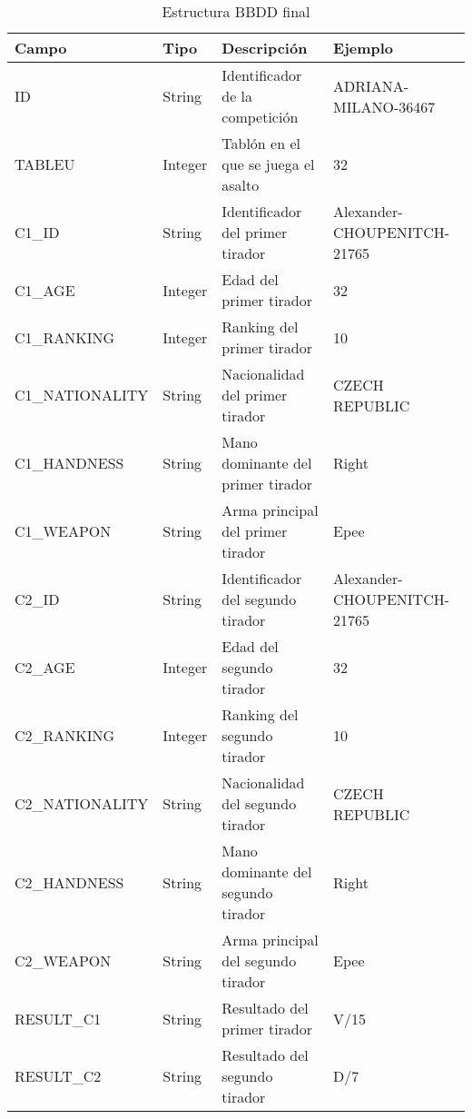 \begin{longtable}{|p{3cm}p{2cm}p{6cm}p{3cm}|}
  \caption{Estructura BBDD final}
  \label{tab:estructura BBDD final}
  \endfirsthead
  \endhead

  \hline
  \rowcolor[HTML]{C0C0C0}
  Campo & Tipo & Descripción & Ejemplo \\ \hline
  ID & String & Identificador de la competición & ADRIANA-MILANO-36467 \\ \hline
  TABLEU & Integer & Tablón en el que se juega el asalto & 32 \\ \hline

  \rowcolor[HTML]{969696}
  C1\_ID & String & Identificador del primer tirador & Alexander-CHOUPENITCH-21765 \\ \hline
  \rowcolor[HTML]{969696}
  C1\_AGE & Integer & Edad del primer tirador & 32 \\ \hline
  \rowcolor[HTML]{969696}
  C1\_RANKING & Integer & Ranking del primer tirador & 10 \\ \hline
  \rowcolor[HTML]{969696}
  C1\_NATIONALITY & String & Nacionalidad del primer tirador & CZECH REPUBLIC \\ \hline
  \rowcolor[HTML]{969696}
  C1\_HANDNESS & String & Mano dominante del primer tirador & Right \\ \hline
  \rowcolor[HTML]{969696}
  C1\_WEAPON & String & Arma principal del primer tirador & Epee \\ \hline

  \rowcolor[HTML]{636363}
  C2\_ID & String & Identificador del segundo tirador & Alexander-CHOUPENITCH-21765 \\ \hline
  \rowcolor[HTML]{636363}
  C2\_AGE & Integer & Edad del segundo tirador & 32 \\ \hline
  \rowcolor[HTML]{636363}
  C2\_RANKING & Integer & Ranking del segundo tirador & 10 \\ \hline
  \rowcolor[HTML]{636363}
  C2\_NATIONALITY & String & Nacionalidad del segundo tirador & CZECH REPUBLIC \\ \hline
  \rowcolor[HTML]{636363}
  C2\_HANDNESS & String & Mano dominante del segundo tirador & Right \\ \hline
  \rowcolor[HTML]{636363}
  C2\_WEAPON & String & Arma principal del segundo tirador & Epee \\ \hline

  \rowcolor[HTML]{969696}
  RESULT\_C1 & String & Resultado del primer tirador & V/15 \\ \hline
  \rowcolor[HTML]{636363}
  RESULT\_C2 & String & Resultado del segundo tirador & D/7 \\ \hline
\end{longtable}

